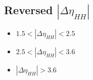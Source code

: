 \subsection{Reversed  $|\Delta \eta_{HH}|$}


\begin{itemize}
	\setlength\itemsep{0em}
	\item $1.5 < |\Delta \eta_{HH}| < 2.5$
	\item $2.5 <  |\Delta \eta_{HH}| < 3.6$
	\item $|\Delta \eta_{HH}| > 3.6$
\end{itemize}

